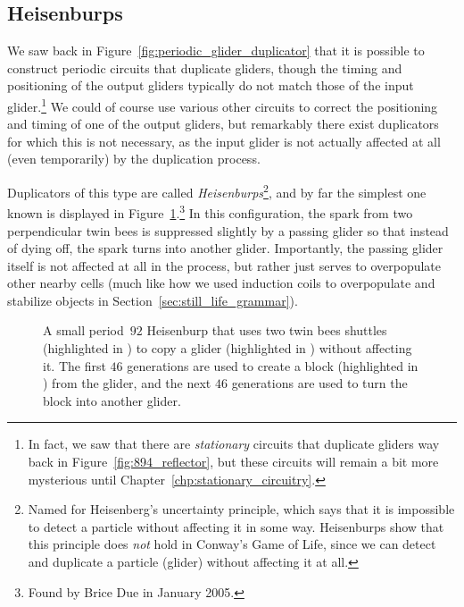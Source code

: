 \subsection{Heisenburps}\label{sec:p46_heisenburps}

We saw back in Figure~\ref{fig:periodic_glider_duplicator} that it is possible to construct periodic circuits that duplicate gliders, though the timing and positioning of the output gliders typically do not match those of the input glider.\footnote{In fact, we saw that there are \emph{stationary} circuits that duplicate gliders way back in Figure~\ref{fig:894_reflector}, but these circuits will remain a bit more mysterious until Chapter~\ref{chp:stationary_circuitry}.} We could of course use various other circuits to correct the positioning and timing of one of the output gliders, but remarkably there exist duplicators for which this is not necessary, as the input glider is not actually affected at all (even temporarily) by the duplication process.

Duplicators of this type are called \emph{Heisenburps}\footnote{Named for Heisenberg's uncertainty principle, which says that it is impossible to detect a particle without affecting it in some way. Heisenburps show that this principle does \emph{not} hold in Conway's Game of Life, since we can detect and duplicate a particle (glider) without affecting it at all.}, and by far the simplest one known is displayed in Figure~\ref{fig:p46_natural_heisenburp}.\footnote{Found by Brice Due in January 2005.} In this configuration, the spark from two perpendicular twin bees is suppressed slightly by a passing glider so that instead of dying off, the spark turns into another glider. Importantly, the passing glider itself is not affected at all in the process, but rather just serves to overpopulate other nearby cells (much like how we used induction coils to overpopulate and stabilize objects in Section~\ref{sec:still_life_grammar}).

\begin{figure}[!htb]
	\centering
	\caption{A small period~$92$ Heisenburp that uses two twin bees shuttles (highlighted in ) to copy a glider (highlighted in ) without affecting it. The first $46$ generations are used to create a block (highlighted in ) from the glider, and the next $46$ generations are used to turn the block into another glider.}\label{fig:p46_natural_heisenburp}
\end{figure}

